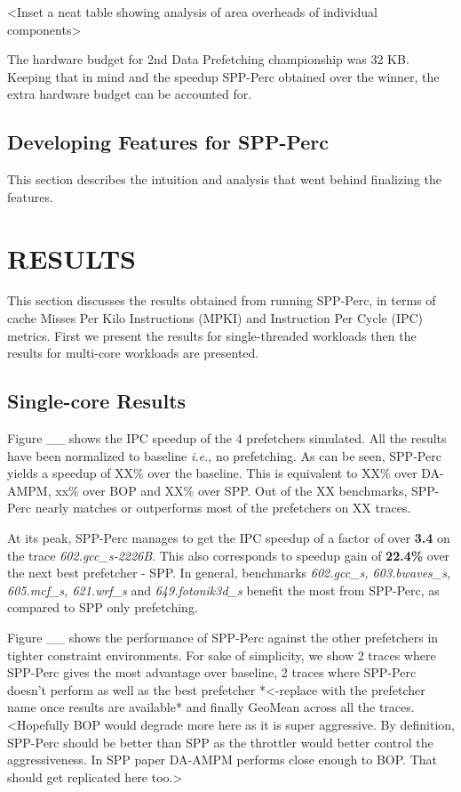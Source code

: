\documentclass{sig-alternate}
\begin{document}
<Inset a neat table showing analysis of area overheads of individual components>

The hardware budget for 2nd Data Prefetching championship was 32 KB. Keeping that in mind and the speedup SPP-Perc obtained over the winner, the extra hardware budget can be accounted for.

\subsection{Developing Features for SPP-Perc}
This section describes the intuition and analysis that went behind finalizing the features.  


\section{RESULTS}
This section discusses the results obtained from running SPP-Perc, in terms of cache Misses Per Kilo Instructions (MPKI) and Instruction Per Cycle (IPC) metrics. First we present the results for single-threaded workloads then the results for multi-core workloads are presented.

\subsection{Single-core Results}
Figure \_\_ shows the IPC speedup of the 4 prefetchers simulated. All the results have been normalized to baseline \textit{i.e.}, no prefetching. As can be seen, SPP-Perc yields a speedup of XX\% over the baseline. This is equivalent to XX\% over DA-AMPM, xx\% over BOP and XX\% over SPP. Out of the XX benchmarks, SPP-Perc nearly matches or outperforms most of the prefetchers on XX traces. 

At its peak, SPP-Perc manages to get the IPC speedup of a factor of over \textbf{3.4} on the trace \textit{602.gcc\_s-2226B}. This also corresponds to speedup gain of \textbf{22.4\%} over the next best prefetcher - SPP. In general, benchmarks \textit{602.gcc\_s, 603.bwaves\_s, 605.mcf\_s, 621.wrf\_s} and \textit{649.fotonik3d\_s} benefit the most from SPP-Perc, as compared to SPP only prefetching.

Figure \_\_ shows the performance of SPP-Perc against the other prefetchers in tighter constraint environments. For sake of simplicity, we show 2 traces where SPP-Perc gives the most advantage over baseline, 2 traces where SPP-Perc doesn't perform as well as the best prefetcher *<-replace with the prefetcher name once results are available* and finally GeoMean across all the traces. <Hopefully BOP would degrade more here as it is super aggressive. By definition, SPP-Perc should be better than SPP as the throttler would better control the aggressiveness. In SPP paper DA-AMPM performs close enough to BOP. That should get replicated here too.>
\end{document}
